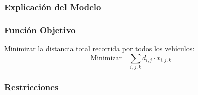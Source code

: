 \documentclass[12pt]{article}
\begin{document}
\subsubsection{Explicación del Modelo}

\subsubsection*{Función Objetivo}

Minimizar la distancia total recorrida por todos los vehículos:
\[
\text{Minimizar} \quad \sum_{i,j,k} d_{i,j} \cdot x_{i,j,k}
\]

\subsubsection*{Restricciones}
\end{document}
